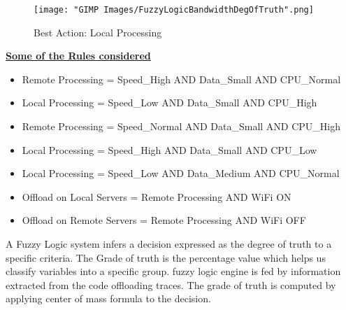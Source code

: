 \documentclass[12pt]{report}
\begin{document}
\begin{center}
\begin{figure}[h!]
  \centering
  \texttt{[image: "GIMP Images/FuzzyLogicBandwidthDegOfTruth".png]}
  \caption{Best Action: Local Processing}
  \label{fig:FuzzyLogicBandwidthDegOfTruth}
\end{figure}


\textbf{\underline{Some of the Rules considered}}
\begin{itemize}
\item Remote Processing = Speed\_High AND Data\_Small AND CPU\_Normal
\item Local Processing = Speed\_Low AND Data\_Small AND CPU\_High
\item Remote Processing = Speed\_Normal AND Data\_Small AND CPU\_High
\item Local Processing = Speed\_High AND Data\_Small AND CPU\_Low
\item Local Processing = Speed\_Low AND Data\_Medium AND CPU\_Normal
\item Offload on Local Servers = Remote Processing AND WiFi ON
\item Offload on Remote Servers = Remote Processing AND WiFi OFF
\end{itemize}
\end{center}

A Fuzzy Logic system infers a decision expressed as the degree of truth to a specific criteria. The Grade of truth is the percentage value which helps us classify variables into a specific group. fuzzy logic engine is fed by information extracted from the code offloading traces. The grade of truth is computed by applying center of mass formula to the decision.
\begin{comment}
\begin{figure}
  \centering
  \framecolorbox{black}{black}{\texttt{[image: "GIMP Images/offloading\_normal\_checked".png]}}
  \caption{Offloading App Activity}
  \label{fig:offloading_normal_checked}
\end{figure}

\begin{figure}[h!]
  \centering
  \begin{subfigure}[b]{0.2\textwidth}
    \fcolorbox{black}{black}{\texttt{[image: "GIMP Images/offloading\_bandwidth".png]}}
    \caption{Select Bandwidth}
    \label{fig:offloading_bandwidth}
  \end{subfigure}
\quad
  \begin{subfigure}[b]{0.2\textwidth}
    \fcolorbox{black}{black}{\texttt{[image: "GIMP Images/offloading\_data".png]}}
    \caption{Select Data}
    \label{fig:offloading_data}
  \end{subfigure}
\quad
  \begin{subfigure}[b]{0.2\textwidth}
    \fcolorbox{black}{black}{\texttt{[image: "GIMP Images/offloading\_CPU".png]}}
    \caption{CPU instance}
    \label{fig:offloading_CPU}
  \end{subfigure}
  \caption{Select Parameters Manually}\label{fig:parameters}
\end{figure} 
\end{comment}
\end{document}
